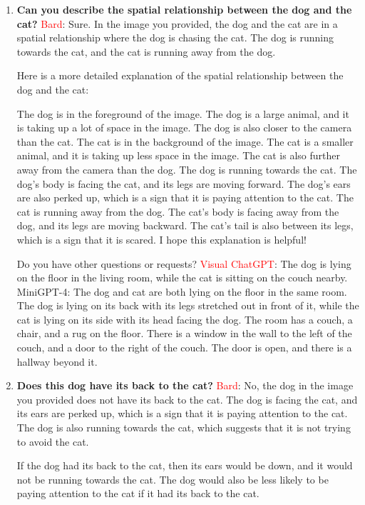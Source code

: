 \begin{enumerate}
    \item \textbf{Can you describe the spatial relationship between the dog and the cat?}
    \subitem \textcolor{Red}{Bard}: Sure. In the image you provided, the dog and the cat are in a spatial relationship where the dog is chasing the cat. The dog is running towards the cat, and the cat is running away from the dog.

    Here is a more detailed explanation of the spatial relationship between the dog and the cat:
    
    The dog is in the foreground of the image. The dog is a large animal, and it is taking up a lot of space in the image. The dog is also closer to the camera than the cat.
    The cat is in the background of the image. The cat is a smaller animal, and it is taking up less space in the image. The cat is also further away from the camera than the dog.
    The dog is running towards the cat. The dog's body is facing the cat, and its legs are moving forward. The dog's ears are also perked up, which is a sign that it is paying attention to the cat.
    The cat is running away from the dog. The cat's body is facing away from the dog, and its legs are moving backward. The cat's tail is also between its legs, which is a sign that it is scared.
    I hope this explanation is helpful!
    
    Do you have other questions or requests?
    \subitem \textcolor{red}{Visual ChatGPT}: The dog is lying on the floor in the living room, while the cat is sitting on the couch nearby.
    \subitem MiniGPT-4: The dog and cat are both lying on the floor in the same room. The dog is lying on its back with its legs stretched out in front of it, while the cat is lying on its side with its head facing the dog. The room has a couch, a chair, and a rug on the floor. There is a window in the wall to the left of the couch, and a door to the right of the couch. The door is open, and there is a hallway beyond it.
    \item \textbf{Does this dog have its back to the cat?}
    \subitem \textcolor{Red}{Bard}: 
    No, the dog in the image you provided does not have its back to the cat. The dog is facing the cat, and its ears are perked up, which is a sign that it is paying attention to the cat. The dog is also running towards the cat, which suggests that it is not trying to avoid the cat.
    
    If the dog had its back to the cat, then its ears would be down, and it would not be running towards the cat. The dog would also be less likely to be paying attention to the cat if it had its back to the cat.
    

\end{enumerate}

